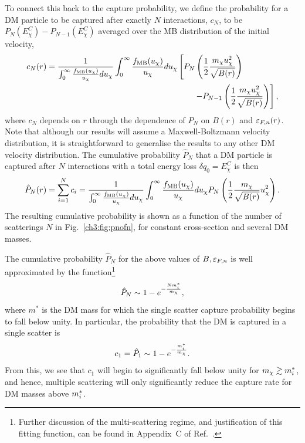 To connect this back to the capture probability, we define the probability for a DM particle to be captured after exactly $N$ interactions, $c_N$, to be $P_N(E^C_\chi) - P_{N-1}(E^C_\chi)$ averaged over the MB distribution of the initial velocity,
\begin{equation}
    \begin{split}
        c_N(r) &= \frac{1}{\int_0^\infty \frac{\fMB(u_\chi)}{u_\chi}du_\chi}\int_0^\infty \frac{\fMB(u_\chi)}{u_\chi}du_\chi \left[P_N\left(\frac{1}{2}\frac{m_\chi u_\chi^2}{\sqrt{B(r)}}\right)\right.\\
        &\hspace{18em}\left. -P_{N-1}\left(\frac{1}{2}\frac{m_\chi u_\chi^2}{\sqrt{B(r)}}\right)\right], 
    \end{split}
\end{equation}
where $c_N$ depends on $r$ through the dependence of $P_N$  on $B(r)$ and $\varepsilon_{F,n}(r)$. Note that although our results will assume a Maxwell-Boltzmann velocity distribution, it is straightforward to generalise the results to any other DM velocity distribution. The cumulative probability $\hat{P}_N$ that a DM particle is captured after $N$ interactions with a total energy loss  $\delta q_0=E_\chi^C$ is then
\begin{equation}
\hat{P}_N(r) = \sum_{i=1}^N c_i = \frac{1}{\int_0^\infty \frac{f_{\rm MB}(u_\chi)}{u_\chi}du_\chi}\int_0^\infty \frac{f_{\rm MB}(u_\chi)}{u_\chi}du_\chi P_N\left(\frac{1}{2}\frac{m_\chi}{\sqrt{B(r)}} u_\chi^2\right).
\end{equation}
%
The resulting cumulative probability is shown as a function of the number of scatterings $N$ in Fig.~\ref{ch3:fig:pnofn}, for constant cross-section and several DM masses. 

The cumulative probability $\hat{P}_N$ for the above values of $B,\varepsilon_{F,n}$ is well approximated by the function\footnote{Further discussion of the multi-scattering regime, and justification of this fitting function, can be found in Appendix~C of Ref.~\cite{Bell:2020jou_sep_ImprovedTreatmentDark}.}
\begin{equation}
\hat{P}_N \sim  1-e^{-\frac{N m_i^*}{m_\chi}},\label{ch3:eq:pncum}
\end{equation}
where $m^*$ is the DM mass for which the single scatter capture probability begins to fall below unity. In particular, the probability that the DM is captured in a single scatter is 
\begin{equation}
c_1=\hat{P}_1 \sim  1-e^{-\frac{m_i^*}{m_\chi}}.
\label{ch3:eq:c1}
\end{equation}
From this, we see that $c_1$ will begin to significantly fall below unity for $m_\chi \gtrsim m_i^*$, and hence, multiple scattering will only significantly reduce the capture rate for DM masses above $m_i^*$. 

